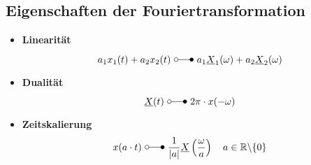 \subsection{Eigenschaften der Fouriertransformation}
\begin{mdframed}[style=exercise,nobreak]
	\begin{itemize}
		\item \textbf{Linearität}
		      \[
			      a_{1} x_{1}(t)+a_{2} x_{2}(t)\ \laplace\  a_{1} \underline{X}_{1}(\omega)+a_{2} \underline{X}_{2}(\omega)
		      \]
		\item \textbf{Dualität}
		      \[
			      \underline{X}(t)\ \laplace\  2\pi\cdot x(-\omega)
		      \]
		\item \textbf{Zeitskalierung}
		      \[
			      x(a \cdot t)\ \laplace\ \frac{1}{|a|} \underline{X}\left(\frac{\omega}{a}\right) \quad a \in \mathbb{R} \backslash\{0\}
		      \]
    \end{itemize}
\end{mdframed}

